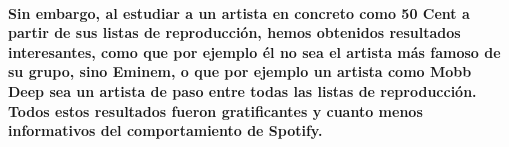 \documentclass[11pt,spanish]{article}
\begin{document}
\paragraph*{Sin embargo, al estudiar a un artista en concreto como 50 Cent a partir de sus listas de reproducción, hemos obtenidos resultados interesantes, como que por ejemplo él no sea el artista más famoso de su grupo, sino Eminem, o que por ejemplo un artista como Mobb Deep sea un artista de paso entre todas las listas de reproducción.
Todos estos resultados fueron gratificantes y cuanto menos informativos del comportamiento de Spotify.}
\end{document}
